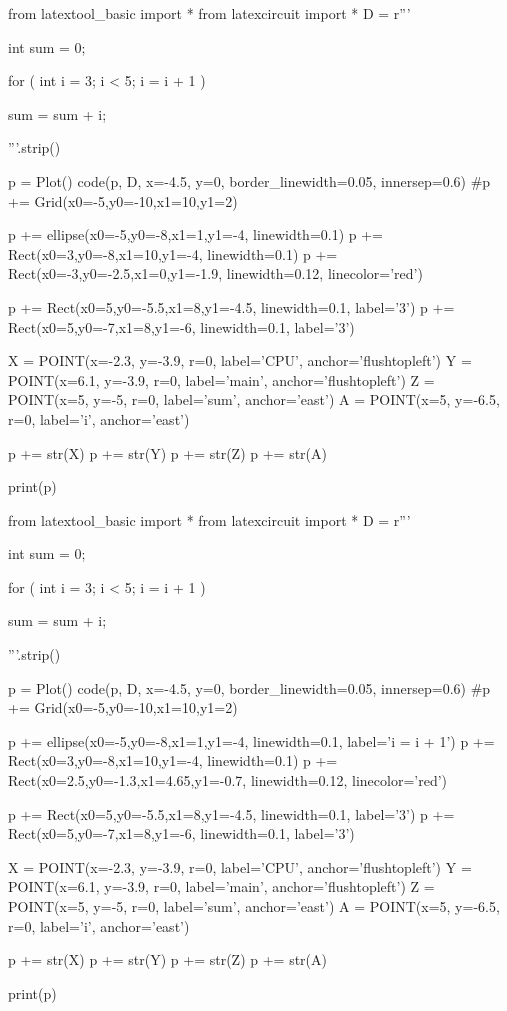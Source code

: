 \begin{python}
from latextool_basic import *
from latexcircuit import *
D = r'''



int sum = 0;

    for ( int i = 3;     i < 5;     i = i + 1 )


        sum = sum + i;



'''.strip()

p = Plot()
code(p, D, x=-4.5, y=0, border_linewidth=0.05, innersep=0.6)
#p += Grid(x0=-5,y0=-10,x1=10,y1=2)

p += ellipse(x0=-5,y0=-8,x1=1,y1=-4, linewidth=0.1)
p += Rect(x0=3,y0=-8,x1=10,y1=-4, linewidth=0.1)
p += Rect(x0=-3,y0=-2.5,x1=0,y1=-1.9, linewidth=0.12, linecolor='red')

p += Rect(x0=5,y0=-5.5,x1=8,y1=-4.5, linewidth=0.1, label='3')
p += Rect(x0=5,y0=-7,x1=8,y1=-6, linewidth=0.1, label='3')

X = POINT(x=-2.3, y=-3.9, r=0, label='CPU', anchor='flushtopleft')
Y = POINT(x=6.1, y=-3.9, r=0, label='main', anchor='flushtopleft')
Z = POINT(x=5, y=-5, r=0, label='sum', anchor='east')
A = POINT(x=5, y=-6.5, r=0, label='i', anchor='east')

p += str(X)
p += str(Y)
p += str(Z)
p += str(A)

print(p)
\end{python}

\begin{python}
from latextool_basic import *
from latexcircuit import *
D = r'''



int sum = 0;

    for ( int i = 3;     i < 5;     i = i + 1 )


        sum = sum + i;



'''.strip()

p = Plot()
code(p, D, x=-4.5, y=0, border_linewidth=0.05, innersep=0.6)
#p += Grid(x0=-5,y0=-10,x1=10,y1=2)

p += ellipse(x0=-5,y0=-8,x1=1,y1=-4, linewidth=0.1, label='i = i + 1')
p += Rect(x0=3,y0=-8,x1=10,y1=-4, linewidth=0.1)
p += Rect(x0=2.5,y0=-1.3,x1=4.65,y1=-0.7, linewidth=0.12, linecolor='red')

p += Rect(x0=5,y0=-5.5,x1=8,y1=-4.5, linewidth=0.1, label='3')
p += Rect(x0=5,y0=-7,x1=8,y1=-6, linewidth=0.1, label='3')

X = POINT(x=-2.3, y=-3.9, r=0, label='CPU', anchor='flushtopleft')
Y = POINT(x=6.1, y=-3.9, r=0, label='main', anchor='flushtopleft')
Z = POINT(x=5, y=-5, r=0, label='sum', anchor='east')
A = POINT(x=5, y=-6.5, r=0, label='i', anchor='east')

p += str(X)
p += str(Y)
p += str(Z)
p += str(A)

print(p)
\end{python}

